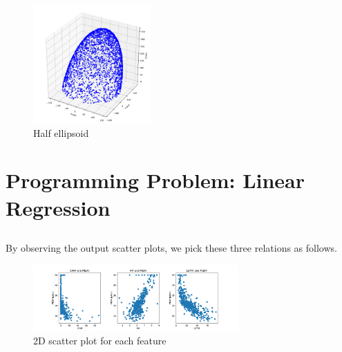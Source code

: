 \documentclass{article}
\begin{document}
\subsection{}
\begin{figure}[htbp]
    \begin{center}
        \includegraphics[width=0.4\textwidth]{./figure/ellipsoid_f2.pdf}
    \end{center}
    \caption{Half ellipsoid}\label{fig:}
\end{figure}
\clearpage
\section{Programming Problem: Linear Regression}
\subsection{}
By observing the output scatter plots, we pick these three relations as follows.
\begin{figure}[htbp]
    \begin{center}
        \includegraphics[width=0.7\textwidth]{./figure/linear_f2.pdf}
    \end{center}
    \caption{2D scatter plot for each feature}\label{fig:}
\end{figure}
\end{document}
